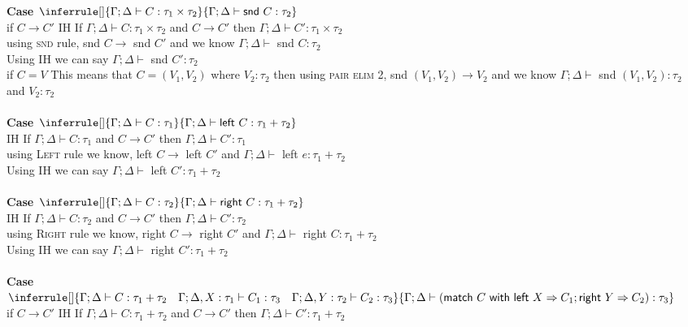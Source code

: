 \documentclass{article}
\begin{document}
\textbf{Case $\inferrule []
{ \Gamma ; \Delta \vdash C : \tau_1 \times \tau_2 }
{ \Gamma ; \Delta \vdash \textsf{snd}\ C : \tau_2 }$ } \\
if $C \to C'$
IH If $\Gamma;\Delta \vdash C : \tau_1 \times \tau_2$ and  $C \to C'$ then $\Gamma;\Delta \vdash C' : \tau_1 \times \tau_2$ \\
using \textsc{snd} rule, snd $C \to$ snd $C'$ and we know $\Gamma;\Delta \vdash$ snd $C : \tau_2$ \\
Using IH we can say $\Gamma;\Delta \vdash$ snd $ C' : \tau_2$ \\
if $C = V$ This means that $C = (V_1, V_2)$ where $V_2 : \tau_2$
then using \textsc{pair elim 2}, snd $(V_1, V_2) \to V_2$ and we know $\Gamma;\Delta \vdash$ snd $(V_1, V_2) : \tau_2$ \\
and $V_2: \tau_2$\\\\
\textbf{Case $\inferrule []
{ \Gamma ; \Delta \vdash C : \tau_1 }
{ \Gamma ; \Delta \vdash \textsf{left}\ C : \tau_1 + \tau_2 }$ } \\
IH If $\Gamma;\Delta \vdash C : \tau_1$ and  $C \to C'$ then $\Gamma;\Delta \vdash C' : \tau_1$ \\
using \textsc{Left} rule we know, left $C \to$ left $C'$ and $\Gamma;\Delta \vdash$ left $e : \tau_1+\tau_2$ \\
Using IH we can say $\Gamma;\Delta \vdash$ left $ C' : \tau_1 + \tau_2$ \\\\
\textbf{Case $\inferrule []
{ \Gamma ; \Delta \vdash C : \tau_2 }
{ \Gamma ; \Delta \vdash \textsf{right}\ C : \tau_1 + \tau_2 }$ } \\
IH If $\Gamma;\Delta \vdash C : \tau_2$ and  $C \to C'$ then $\Gamma;\Delta \vdash C' : \tau_2$ \\
using \textsc{Right} rule we know, right $C \to$ right $C'$ and $\Gamma;\Delta \vdash$ right $C : \tau_1+\tau_2$ \\
Using IH we can say $\Gamma;\Delta \vdash$ right $ C' : \tau_1 + \tau_2$ \\\\
\textbf{Case $\inferrule []
{ \Gamma ; \Delta \vdash C : \tau_1+\tau_2 \quad \Gamma ; \Delta , X : \tau_1 \vdash C_1 : \tau_3 \quad \Gamma ; \Delta , Y : \tau_2 \vdash C_2 : \tau_3  }
{ \Gamma ; \Delta \vdash (\textsf{match}\ C \ \textsf{with left}\ X \Rightarrow C_1 ; \textsf{right}\ Y \Rightarrow C_2) : \tau_3 } $ } \\
if $C \to C'$
IH If $\Gamma;\Delta \vdash C : \tau_1+\tau_2$ and  $C \to C'$ then $\Gamma;\Delta \vdash C' : \tau_1+\tau_2$ \\
\end{document}
